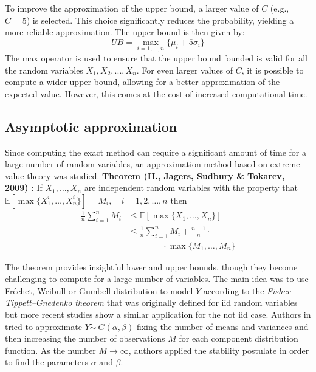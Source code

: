 To improve the approximation of the upper bound, a larger value of \( C \) (e.g., \( C = 5 \)) is selected. This choice significantly reduces the probability, yielding a more reliable approximation. The upper bound is then given by:
$$UB = \max_{i=1, \ldots, n} \{\mu_i + 5 \sigma_i\}$$
The max operator is used to ensure that the upper bound founded is valid for all the random variables $X_1, X_2, ..., X_n$. For even larger values of \( C \), it is possible to compute a wider upper bound, allowing for a better approximation of the expected value. However, this comes at the cost of increased computational time.

\subsection{Asymptotic approximation}
Since computing the exact method can require a significant amount of time for a large number of random variables, an approximation method based on extreme value theory was studied.
\textbf{Theorem (H., Jagers, Sudbury \& Tokarev, 2009) \cite{hamza2009mixing}}: If $X_1, \ldots, X_n$ are independent random variables with the property that  $\mathbb{E}[\max\{X_1^i, \ldots, X_n^i\}] = M_i, \quad i = 1, 2, \ldots, n$ then 
\begin{align*}
    \frac{1}{n} \sum_{i=1}^n M_i &\leq \mathbb{E}[\max\{X_1, \ldots, X_n\}] \\
    &\leq \frac{1}{n} \sum_{i=1}^n M_i + \frac{n-1}{n} \cdot \\ 
    & \qquad \qquad \cdot \max\{M_1, \ldots, M_n\}
\end{align*}

The theorem provides insightful lower and upper bounds, though they become challenging to compute for a large number of variables. The main idea was to use Fréchet, Weibull or Gumbell distribution to model $Y$ according to the \textit{Fisher–Tippett–Gnedenko theorem} \cite{fisher1928limiting} that was originally defined for iid random variables but more recent studies show a similar application for the not iid case. Authors in \cite{padua2013distribution} tried to approximate $Y \dot \sim \ G(\alpha, \beta)$ fixing the number of means and variances and then increasing the number of observations $M$ for each component distribution function. As the number $M \rightarrow \infty$, authors applied the stability postulate in order to find the parameters $\alpha$ and $\beta$.


